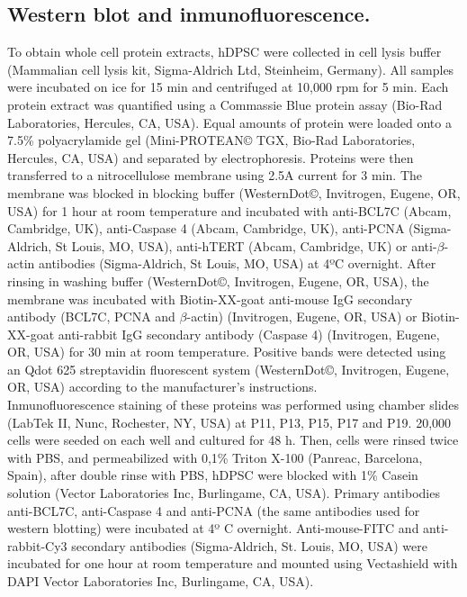\documentclass[a4paper,12pt]{article}
\begin{document}
\subsection{Western blot and inmunofluorescence.}
To obtain whole cell protein extracts, hDPSC were collected in cell lysis buffer (Mammalian cell lysis kit, Sigma-Aldrich Ltd, Steinheim, Germany). All samples were incubated on ice for 15 min and centrifuged at 10,000 rpm for 5 min. Each protein extract was quantified using a Commassie Blue protein assay (Bio-Rad Laboratories, Hercules, CA, USA). Equal amounts of protein were loaded onto a 7.5\% polyacrylamide gel (Mini-PROTEAN© TGX, Bio-Rad Laboratories, Hercules, CA, USA) and separated by electrophoresis. Proteins were then transferred to a nitrocellulose membrane using 2.5A current for 3 min. The membrane was blocked in blocking buffer (WesternDot©, Invitrogen, Eugene, OR, USA) for 1 hour at room temperature and incubated with anti-BCL7C (Abcam, Cambridge, UK), anti-Caspase 4 (Abcam, Cambridge, UK), anti-PCNA (Sigma-Aldrich, St Louis, MO, USA), anti-hTERT (Abcam, Cambridge, UK) or anti-$\beta$-actin antibodies (Sigma-Aldrich, St Louis, MO, USA) at 4ºC overnight. After rinsing in washing buffer (WesternDot©, Invitrogen, Eugene, OR, USA), the membrane was incubated with Biotin-XX-goat anti-mouse IgG secondary antibody (BCL7C, PCNA and $\beta$-actin) (Invitrogen, Eugene, OR, USA) or Biotin-XX-goat anti-rabbit IgG secondary antibody (Caspase 4) (Invitrogen, Eugene, OR, USA) for 30 min at room temperature. Positive bands were detected using an Qdot 625 streptavidin fluorescent system (WesternDot©, Invitrogen, Eugene, OR, USA) according to the manufacturer’s instructions.\\
Inmunofluorescence staining of these proteins was performed using chamber slides (LabTek II, Nunc, Rochester, NY, USA) at P11, P13, P15, P17 and P19. 20,000 cells were seeded on each well and cultured for 48 h. Then, cells were rinsed twice with PBS, and permeabilized with 0,1\% Triton X-100 (Panreac, Barcelona, Spain), after double rinse with PBS, hDPSC were blocked with 1\% Casein solution (Vector Laboratories Inc, Burlingame, CA, USA). Primary antibodies anti-BCL7C, anti-Caspase 4 and anti-PCNA (the same antibodies used for western blotting) were incubated at 4º C overnight. Anti-mouse-FITC and anti-rabbit-Cy3 secondary antibodies (Sigma-Aldrich, St. Louis, MO, USA) were incubated for one hour at room temperature and mounted using Vectashield with DAPI Vector Laboratories Inc, Burlingame, CA, USA).\\
\end{document}
